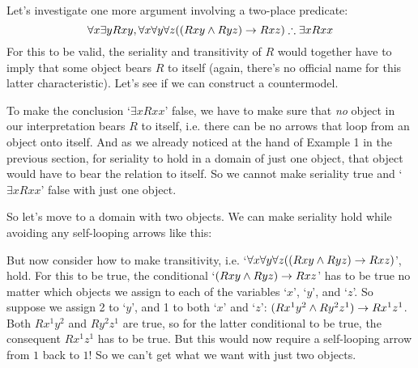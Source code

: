 Let's investigate one more argument involving a two-place predicate:
$$\forall x\exists yRxy, \forall x \forall y \forall z((Rxy \wedge Ryz) \rightarrow Rxz) \therefore \exists xRxx$$
For this to be valid, the seriality and transitivity of $R$ would together have to imply that some object bears $R$ to itself (again, there's no official name for this latter characteristic).  Let's see if we can construct a countermodel.

To make the conclusion `$\exists xRxx$' false, we have to make sure that \emph{no} object in our interpretation bears $R$ to itself, i.e. there can be no arrows that loop from an object onto itself.  And as we already noticed at the hand of Example 1 in the previous section, for seriality to hold in a domain of just one object, that object would have to bear the relation to itself.  So we cannot make seriality true and `$\exists xRxx$' false with just one object.

So let's move to a domain with two objects.  We can make seriality hold while avoiding any self-looping arrows like this:
\begin{center}
\end{center}
But now consider how to make transitivity, i.e. `$\forall x \forall y \forall z((Rxy \wedge Ryz) \rightarrow Rxz)$', hold.  For this to be true, the conditional `$(Rxy \wedge Ryz) \rightarrow Rxz$' has to be true no matter which objects we assign to each of the variables `$x$', `$y$', and `$z$'. So suppose we assign  2 to `$y$', and 1 to both `$x$' and `$z$': $(Rx^1y^2 \wedge Ry^2z^1) \rightarrow Rx^1z^1$.  Both $Rx^1y^2$ and $Ry^2z^1$ are true, so for the latter conditional to be true, the consequent $Rx^1z^1$ has to be true.  But this would now require a self-looping arrow from $1$ back to $1$!  So we can't get what we want with just two objects.

